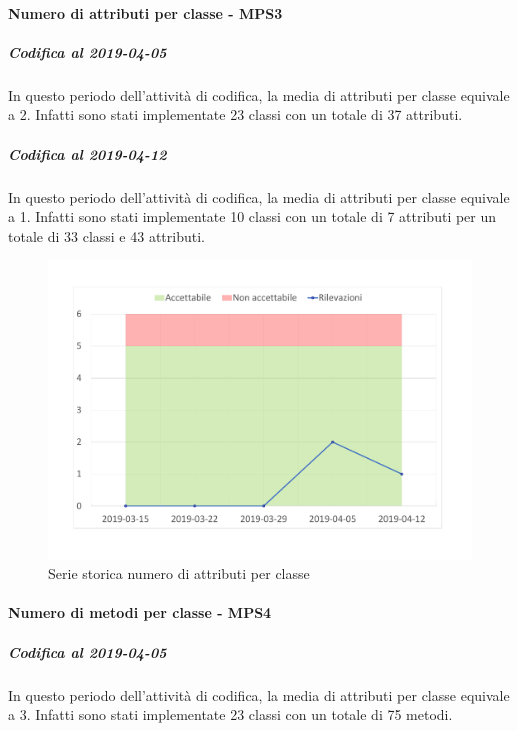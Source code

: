 \paragraph{Numero di attributi per classe - MPS3}
\subparagraph{Codifica al 2019-04-05}
In questo periodo dell'attività di codifica, la media di attributi per classe equivale a 2. Infatti sono stati implementate 23 classi con un totale di 37 attributi.

\subparagraph{Codifica al 2019-04-12}
In questo periodo dell'attività di codifica, la media di attributi per classe equivale a 1. Infatti sono stati implementate 10 classi con un totale di 7 attributi per un totale di 33 classi e 43 attributi.
\begin{figure}[H]
	\centering
	\includegraphics[scale=0.6]{images/resoconto/MPS3Chart.pdf}
	\caption{Serie storica numero di attributi per classe}	
\end{figure}

\paragraph{Numero di metodi per classe - MPS4}
\subparagraph{Codifica al 2019-04-05}
In questo periodo dell'attività di codifica, la media di attributi per classe equivale a 3. Infatti sono stati implementate 23 classi con un totale di 75 metodi.

